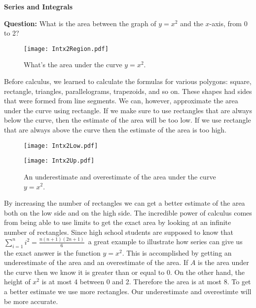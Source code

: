 \documentclass[12pt]{article}
\begin{document}
\begin{center}
\Large{\textbf{Series and Integrals}}
\end{center}
{\bf Question:} What is the area between the graph of $y=x^2$ and the $x$-axis, from 0 to 2?\\
\begin{figure}[h!!]
\begin{center}
  \texttt{[image: Intx2Region.pdf]} 
\end{center}
\caption{What's the area under the curve $y=x^2$.}
\end{figure}

Before calculus, we learned to calculate the formulas for various
polygons: square, rectangle, triangles, parallelograms, 
trapezoids, and so on. These shapes had sides that were formed
from line segments. We can, however, approximate the area 
under the curve using rectangle. If we make sure to use rectangles
that are always below the curve, then the estimate of the area
will be too low. If we use rectangle that are always above the 
curve then the estimate of the area is too high. 
\begin{figure}[h!]
	\begin{minipage}[c]{.5\textwidth}
	\vspace{0pt}	%
	\centering
	  \texttt{[image: Intx2Low.pdf]} 
	\end{minipage}%
	\begin{minipage}[c]{.5\textwidth}
	\vspace{0pt}	%
	  \texttt{[image: Intx2Up.pdf]} 
	\end{minipage}
\caption{An underestimate and overestimate of the area under
the curve $y=x^2$.}
\end{figure}

By increasing the number of rectangles we can get a better 
estimate of the area both on the low side and on the high side. The 
incredible power of calculus comes from being able to use limits
to get the exact area by looking at an infinite number of 
rectangles. Since high school students are supposed
to know that $\sum_{i=1}^{n}i^2=\frac{n(n+1)(2n+1)}{6}$ \,a
great example to illustrate how series can give us the exact
answer is the function $y=x^2$. This is accomplished by getting 
an underestimate of the area and an overestimate of the area. 
If $A$ is the area under the curve then we know it is greater 
than or equal to 0. On the other hand, the height of $x^2$ is at 
most 4 between 0 and 2. Therefore the area is at most 8. To get 
a better estimate we use more rectangles. 
Our underestimate and overestimte will be more accurate.
\end{document}
